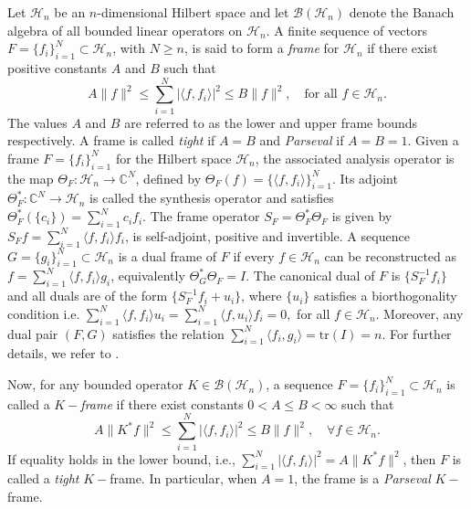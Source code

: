 \documentclass[final,1p,times]{elsarticle}
\begin{document}
Let \( \mathcal{H}_n \) be an \( n \)-dimensional Hilbert space and let \( \mathcal{B}(\mathcal{H}_n) \) denote the Banach algebra of all bounded linear operators on \( \mathcal{H}_n \). A finite sequence of vectors \( F = \{f_i\}_{i=1}^N \subset \mathcal{H}_n \), with \( N \geq n \), is said to form a \textit{frame} for \( \mathcal{H}_n \) if there exist positive constants \( A \) and \( B \) such that
$$ A \|f\|^2 \leq \sum_{i=1}^N |\langle f, f_i \rangle|^2 \leq B \|f\|^2, \quad \text{for all } f \in \mathcal{H}_n. $$
The values \( A \) and \( B \) are referred to as the lower and upper frame bounds respectively. A frame is called \textit{tight} if \( A = B \) and \textit{Parseval} if \( A = B = 1 \). Given a frame \( F = \{f_i\}_{i=1}^N \) for the Hilbert space \( \mathcal{H}_n \), the associated analysis operator is the map \( \Theta_F : \mathcal{H}_n \to \mathbb{C}^N \), defined by \( \Theta_F(f) = \{\langle f, f_i \rangle\}_{i=1}^N \). Its adjoint \( \Theta_F^* : \mathbb{C}^N \to \mathcal{H}_n \) is called the synthesis operator and satisfies \( \Theta_F^*(\{c_i\}) = \sum_{i=1}^N c_i f_i \). The frame operator \( S_F = \Theta_F^* \Theta_F \) is given by \( S_F f = \sum_{i=1}^N \langle f, f_i \rangle f_i \), is self-adjoint, positive and invertible. A sequence \( G = \{g_i\}_{i=1}^N \subset \mathcal{H}_n \) is a dual frame of \( F \) if every \( f \in \mathcal{H}_n \) can be reconstructed as \( f = \sum_{i=1}^N \langle f, f_i \rangle g_i \), equivalently \( \Theta_G^* \Theta_F = I \). The canonical dual of \( F \) is \( \{S_F^{-1} f_i\} \) and all duals are of the form \( \{S_F^{-1}f_i + u_i\} \), where \( \{u_i\} \) satisfies a biorthogonality condition i.e. $\sum_{i=1}^N \langle f, f_i \rangle u_i = \sum_{i=1}^N \langle f, u_i \rangle f_i =0,$ for all $f \in \mathcal{H}_n.$ Moreover, any dual pair \( (F, G) \) satisfies the relation  \( \sum_{i=1}^N \langle f_i, g_i \rangle = \mathrm{tr}(I) = n \). For further details, we refer to \cite{ole}.


Now, for any bounded operator \( K \in \mathcal{B}(\mathcal{H}_n) \), a sequence \( F = \{f_i\}_{i=1}^N \subset \mathcal{H}_n \) is called a \( K-\)\textit{frame} if there exist constants \( 0 < A \leq B < \infty \) such that
\[
A\|K^*f\|^2 \leq \sum_{i=1}^N |\langle f, f_i \rangle|^2 \leq B\|f\|^2, \quad \forall f \in \mathcal{H}_n.
\]
If equality holds in the lower bound, i.e., \( \sum_{i=1}^N |\langle f, f_i \rangle|^2 = A\|K^*f\|^2 \), then \( F \) is called a \textit{tight} \( K-\)frame. In particular, when \( A = 1 \), the frame is a \textit{Parseval} \( K -\)frame.
\end{document}
